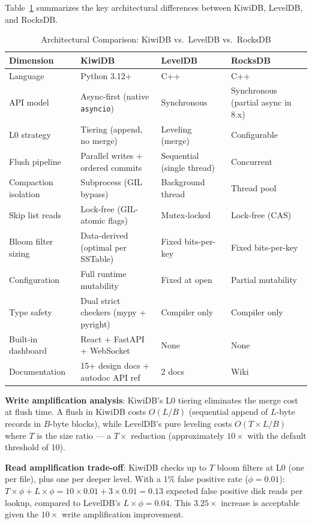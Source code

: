 \documentclass[conference]{IEEEtran}
\begin{document}
Table~\ref{tab:comparison} summarizes the key architectural differences between KiwiDB, LevelDB, and RocksDB.

\begin{table}[t]
\centering
\caption{Architectural Comparison: KiwiDB vs.\ LevelDB vs.\ RocksDB}
\label{tab:comparison}
\begin{tabular}{@{}llll@{}}
\toprule
\textbf{Dimension} & \textbf{KiwiDB} & \textbf{LevelDB} & \textbf{RocksDB} \\
\midrule
Language & Python 3.12+ & C++ & C++ \\
API model & Async-first (native \texttt{asyncio}) & Synchronous & Synchronous (partial async in 8.x) \\
L0 strategy & Tiering (append, no merge) & Leveling (merge) & Configurable \\
Flush pipeline & Parallel writes + ordered commits & Sequential (single thread) & Concurrent \\
Compaction isolation & Subprocess (GIL bypass) & Background thread & Thread pool \\
Skip list reads & Lock-free (GIL-atomic flags) & Mutex-locked & Lock-free (CAS) \\
Bloom filter sizing & Data-derived (optimal per SSTable) & Fixed bits-per-key & Fixed bits-per-key \\
Configuration & Full runtime mutability & Fixed at open & Partial mutability \\
Type safety & Dual strict checkers (mypy + pyright) & Compiler only & Compiler only \\
Built-in dashboard & React + FastAPI + WebSocket & None & None \\
Documentation & 15+ design docs + autodoc API ref & 2 docs & Wiki \\
\bottomrule
\end{tabular}
\end{table}

\textbf{Write amplification analysis}: KiwiDB's L0 tiering eliminates the merge cost at flush time. A flush in KiwiDB costs $O(L/B)$ (sequential append of $L$-byte records in $B$-byte blocks), while LevelDB's pure leveling costs $O(T \times L/B)$ where $T$ is the size ratio --- a $T\times$ reduction (approximately $10\times$ with the default threshold of 10).

\textbf{Read amplification trade-off}: KiwiDB checks up to $T$ bloom filters at L0 (one per file), plus one per deeper level. With a 1\% false positive rate ($\phi = 0.01$): $T \times \phi + L \times \phi = 10 \times 0.01 + 3 \times 0.01 = 0.13$ expected false positive disk reads per lookup, compared to LevelDB's $L \times \phi = 0.04$. This $3.25\times$ increase is acceptable given the $10\times$ write amplification improvement.
\end{document}
